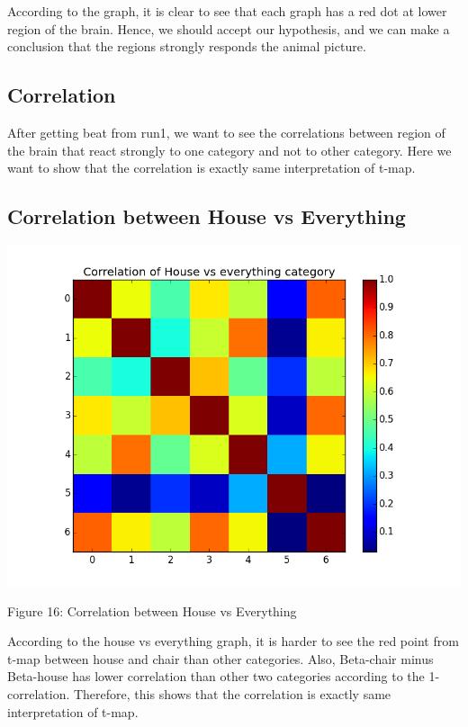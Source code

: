\documentclass[12pt]{article}
\begin{document}
\begin{housevseverything}
\begin{housevseverything}
\begin{housevseverything}
\end{housevseverything}

According to the graph, it is clear to see that each graph has a red dot at lower region of the brain. Hence, we should accept our hypothesis, and we can make a conclusion that the regions strongly responds the animal picture.

\subsection{Correlation}

After getting beat from run1, we want to see the correlations between  region of the brain that react strongly to one category and not to other category. Here we want to show that the correlation is exactly same interpretation  of t-map. 


\subsection{Correlation between House vs Everything}
\begin{housevseverything}
    \centering
      \includegraphics{corr_House_vs_everything}
    \caption{Figure 16: Correlation between House vs Everything}
\end{housevseverything}

According to the house vs everything graph, it is harder to see the red point from t-map between house and chair than other categories. Also, Beta-chair  minus Beta-house has lower correlation than other two categories according to the 1-correlation. Therefore,  this shows that the correlation is exactly same interpretation  of t-map. 


\end{housevseverything}
\end{housevseverything}
\end{document}
